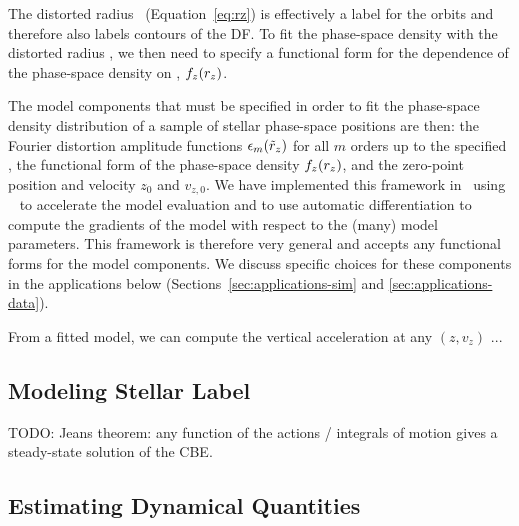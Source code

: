 The distorted radius \rz\ (Equation~\ref{eq:rz}) is effectively a label for the orbits
and therefore also labels contours of the DF.
To fit the phase-space density with the distorted radius \rz, we then need to specify
a functional form for the dependence of the phase-space density on \rz, $f_z(r_z)$.

The model components that must be specified in order to fit the phase-space density
distribution of a sample of stellar phase-space positions are then: the Fourier
distortion amplitude functions $\epsilon_m(\tilde{r}_z)$ for all $m$ orders up to the specified
\mmax, the functional form of the phase-space density $f_z(r_z)$, and the
zero-point position and velocity $z_0$ and $v_{z,0}$.
We have implemented this framework in \python\ using \jax\ \citep{jax:2018} to
accelerate the model evaluation and to use automatic differentiation to compute the
gradients of the model with respect to the (many) model parameters.
This framework is therefore very general and accepts any functional forms for the model
components.
We discuss specific choices for these components in the applications below
(Sections~\ref{sec:applications-sim} and \ref{sec:applications-data}).

From a fitted model, we can compute the vertical acceleration at any $(z, v_z)$ ...


\subsection{Modeling Stellar Label} \label{sec:stellarlabels}

TODO: Jeans theorem: any function of the actions / integrals of motion gives a steady-state solution of the CBE.


\subsection{Estimating Dynamical Quantities} \label{sec:todo}


